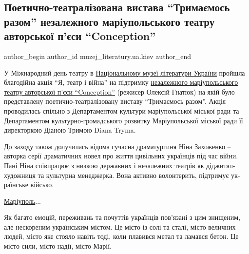  
 
 
 
 

\subsection{Поетично-театралізована вистава \enquote{Тримаємось разом} незалежного маріупольського театру авторської п'єси \enquote{Conception}}
\label{sec:28_03_2023.fb.muzej_literatury.ua.kiev.1.vystava_trymajemos_razom_teatr_conception_mariupol}

\ifcmt
 author_begin
   author_id muzej_literatury.ua.kiev
 author_end
\fi

У Міжнародний день театру в \href{\urlMuzejLiteraturyUkrainyIA}{Національному музеї літератури України} пройшла
благодійна акція \enquote{Я, театр і війна} на підтримку \href{\urlTeatrConceptionMariupolIA}{незалежного маріупольського
театру авторської п'єси \enquote{Conception}} (режисер Олексій Гнатюк) на якій було
представлену поетично-театралізовану виставу \enquote{Тримаємось разом}. Акція
проводилась спільно з Департаментом культури маріупольської міської ради та
Департаментом культурно-громадського розвитку Маріупольської міської ради її
директоркою Діаною Тримою Diana Tryma. 

До заходу також долучилась відома сучасна драматургиня Ніна Захоженко – авторка
серії драматичних новел про життя цивільних українців під час війни. Пані Ніна
співпрацює з низкою державних і незалежних театрів як діджитал-художниця та
культурна менеджерка. Вона активно волонтерить, підтримує ук\hyp{}раїнське військо. 

\href{\urlMariupolIA}{Маріуполь}... 

Як багато емоцій, переживань та почуттів українців пов'язані з цим знищеним,
але нескореним українським містом. Це місто із солі та сталі, місто величних
людей, місто яке стояло навіть тоді, коли плавився метал та ламався бетон. Це
місто сили, місто надії, місто Марії. 

